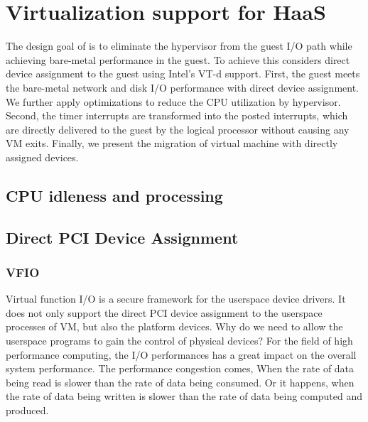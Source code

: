 \section{Virtualization support for HaaS}
The design goal of \name is to eliminate the hypervisor from
the guest I/O path while achieving bare-metal performance in
the guest. To achieve this \name considers direct device
assignment to the guest using Intel's VT-d support. First, the
guest meets the bare-metal network and disk I/O performance
with direct device assignment. We further apply optimizations
to reduce the CPU utilization by hypervisor. Second, the timer
interrupts are transformed into the posted interrupts, which
are directly delivered to the guest by the logical processor
without causing any VM exits. Finally, we present the
migration of virtual machine with directly assigned devices.

\subsection{CPU idleness and processing}

\subsection{Direct PCI Device Assignment}
\subsubsection{VFIO}
Virtual function I/O is a secure framework for the userspace
device drivers. It does not only support the direct PCI device
assignment to the userspace processes of VM, but also the
platform devices. Why do we need to allow the userspace
programs to gain the control of physical devices? For the
field of high performance computing, the I/O performances has
a great impact on the overall system performance. The
performance congestion comes, When the rate of data being read
is slower than the rate of data being consumed. Or it happens,
when the rate of data being written is slower than the rate of
data being computed and produced.

